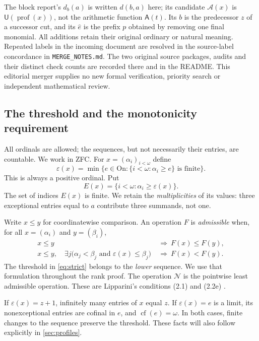 \documentclass[11pt,a4paper]{article}
\theoremstyle{definition}
\newcommand{\On}{\mathrm{On}}
\newcommand{\cf}{\operatorname{cf}}
\newcommand{\OpN}{\mathcal N}
\newcommand{\FunA}{\mathsf A}
\newcommand{\FunU}{\mathsf U}
\newcommand{\tail}{\varepsilon}
\newcommand{\prof}{\operatorname{prof}}
\begin{document}
The block report's $d_b(a)$ is written $d(b,a)$ here; its candidate
$\mathcal A(x)$ is $\FunU(\prof(x))$, not the arithmetic function $\FunA(t)$.
Its $b$ is the predecessor $z$ of a successor cut, and its $\widehat e$ is
the prefix $p$ obtained by removing one final monomial. All additions retain
their original ordinary or natural meaning. Repeated labels in the incoming
document are resolved in the source-label concordance in \texttt{MERGE\_NOTES.md}.
The two original source packages, audits and their distinct check counts
are recorded there and in the README. This editorial merger supplies no new
formal verification, priority search or independent mathematical review.

\subsection{The threshold and the monotonicity requirement}
All ordinals are allowed; the sequences, but not necessarily their entries,
are countable. We work in ZFC. For $x=(\alpha_i)_{i<\omega}$ define
\begin{equation}\label{eq:cut}
 \tail(x)=\min\{e\in\On: \{i<\omega:\alpha_i\ge e\}\text{ is finite}\}.
\end{equation}
This is always a positive ordinal. Put
\begin{equation}\label{eq:exceptions}
 E(x)=\{i<\omega:\alpha_i\ge\tail(x)\}.
\end{equation}
The set of indices $E(x)$ is finite. We retain the \emph{multiplicities} of its
values: three exceptional entries equal to $a$ contribute three summands,
not one.

Write $x\le y$ for coordinatewise comparison. An operation $F$ is
\emph{admissible} when, for all $x=(\alpha_i)$ and $y=(\beta_i)$,
\begin{align}
 x\le y&\ \Longrightarrow\ F(x)\le F(y), \label{eq:weak}\\
 x\le y,\quad \exists j\bigl(\alpha_j<\beta_j\text{ and }
           \tail(x)\le\beta_j\bigr)
 &\ \Longrightarrow\ F(x)<F(y).\label{eq:strict}
\end{align}
The threshold in \eqref{eq:strict} belongs to the \emph{lower} sequence.
We use that formulation throughout the rank proof. The operation $\OpN$ is
the pointwise least admissible operation. These are Lipparini's conditions
(2.1) and (2.2e) \cite[Definition 2.4]{Lipparini2026extended}.

If $\tail(x)=z+1$, infinitely many entries of $x$ equal $z$. If
$\tail(x)=e$ is a limit, its nonexceptional entries are cofinal in $e$, and
$\cf(e)=\omega$. In both cases, finite changes to the sequence preserve the
threshold. These facts will also follow explicitly in \cref{sec:profiles}.
\end{document}
